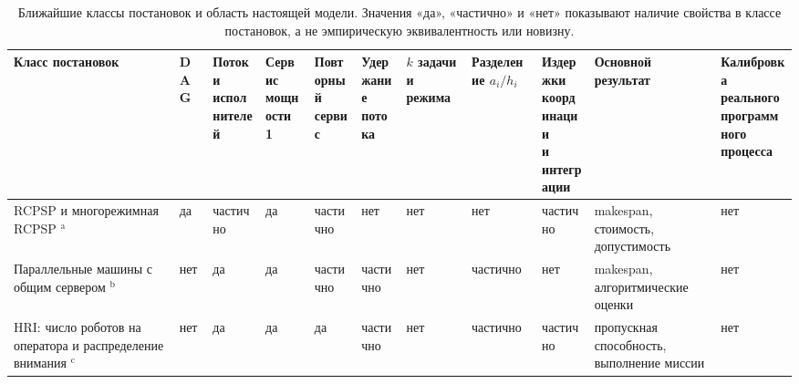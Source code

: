 \begin{landscape}
\begin{table}[!ht]
\centering
\caption{Ближайшие классы постановок и область настоящей модели. Значения «да», «частично» и «нет» показывают наличие свойства в классе постановок, а не эмпирическую эквивалентность или новизну.}
\label{tab:closest-prior-work}
\setlength{\tabcolsep}{2.1pt}
\renewcommand{\arraystretch}{1.18}
\renewcommand{\textsuperscript}[1]{\ensuremath{^{\mathrm{#1}}}}
\scriptsize
\begin{tabular}{>{\raggedright\arraybackslash}p{2.85cm}>{\centering\arraybackslash}p{1.45cm}>{\centering\arraybackslash}p{1.9cm}>{\centering\arraybackslash}p{1.65cm}>{\centering\arraybackslash}p{1.7cm}>{\centering\arraybackslash}p{1.6cm}>{\centering\arraybackslash}p{1.45cm}>{\centering\arraybackslash}p{1.55cm}>{\centering\arraybackslash}p{1.95cm}>{\raggedright\arraybackslash}p{2.6cm}>{\raggedright\arraybackslash}p{4.15cm}}
\toprule
Класс постановок & DAG & \shortstack{Потоки\\исполнителей} & \shortstack{Сервис\\мощности 1} & \shortstack{Повторный\\сервис} & \shortstack{Удержание\\потока} & \shortstack{$k$ задачи\\и режима} & \shortstack{Разделение\\$a_i/h_i$} & \shortstack{Издержки\\координации\\и интеграции} & \shortstack{Основной\\результат} & \shortstack{Калибровка реального\\программного процесса} \\
\midrule
RCPSP и многорежимная RCPSP \cite{brucker1999resource}\textsuperscript{a}
& да & частично & да & частично & нет & нет & нет & частично & makespan, стоимость, допустимость & нет \\

Параллельные машины с общим сервером \cite{hall2000parallel,kravchenko1997parallel,elidrissi2023loading,chakhlevitch2009reentrant}\textsuperscript{b}
& нет & да & да & частично & частично & нет & частично & нет & makespan, алгоритмические оценки & нет \\

HRI: число роботов на оператора и распределение внимания \cite{olsen2004fanout,crandall2005validating,crandall2011computing,cummings2008predicting}\textsuperscript{c}
& нет & да & да & да & частично & нет & частично & частично & пропускная способность, выполнение миссии & нет \\


\end{tabular}
\end{table}
\end{landscape}
